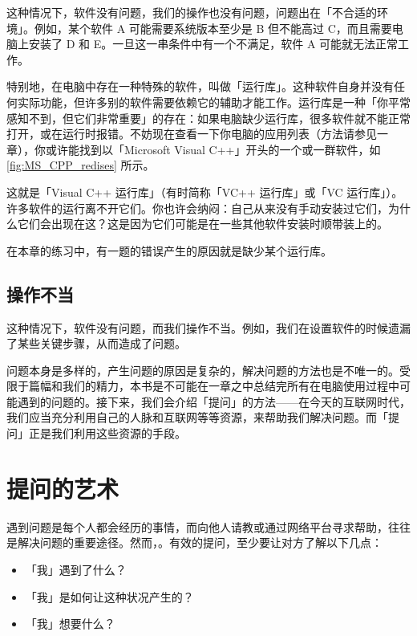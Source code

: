 这种情况下，软件没有问题，我们的操作也没有问题，问题出在「不合适的环境」。例如，某个软件 A 可能需要系统版本至少是 B 但不能高过 C，而且需要电脑上安装了 D 和 E。一旦这一串条件中有一个不满足，软件 A 可能就无法正常工作。

特别地，在电脑中存在一种特殊的软件，叫做「运行库」。这种软件自身并没有任何实际功能，但许多别的软件需要依赖它的辅助才能工作。运行库是一种「你平常感知不到，但它们非常重要」的存在：如果电脑缺少运行库，很多软件就不能正常打开，或在运行时报错。不妨现在查看一下你电脑的应用列表（方法请参见一章），你或许能找到以「Microsoft Visual C++」开头的一个或一群软件，如\autoref{fig:MS_CPP_redises} 所示。

这就是「Visual C++ 运行库」（有时简称「VC++ 运行库」或「VC 运行库」）。许多软件的运行离不开它们。你也许会纳闷：自己从来没有手动安装过它们，为什么它们会出现在这？这是因为它们可能是在一些其他软件安装时顺带装上的。

在本章的练习中，有一题的错误产生的原因就是缺少某个运行库。

\subsection{操作不当}

这种情况下，软件没有问题，而我们操作不当。例如，我们在设置软件的时候遗漏了某些关键步骤，从而造成了问题。

问题本身是多样的，产生问题的原因是复杂的，解决问题的方法也是不唯一的。受限于篇幅和我们的精力，本书是不可能在一章之中总结完所有在电脑使用过程中可能遇到的问题的。接下来，我们会介绍「提问」的方法——在今天的互联网时代，我们应当充分利用自己的人脉和互联网等等资源，来帮助我们解决问题。而「提问」正是我们利用这些资源的手段。

\section{提问的艺术}

遇到问题是每个人都会经历的事情，而向他人请教或通过网络平台寻求帮助，往往是解决问题的重要途径。然而，。有效的提问，至少要让对方了解以下几点：

\begin{itemize}
  \item 「我」遇到了什么？
  \item 「我」是如何让这种状况产生的？
  \item 「我」想要什么？
\end{itemize}


